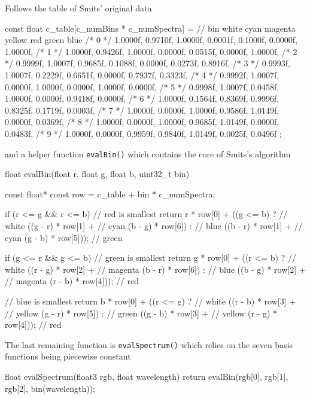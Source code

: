 Follows the table of Smits' original data

\begin{c++code}
const float c_table[c_numBins * c_numSpectra] =
{
//  bin    white    cyan     magenta  yellow   red      green    blue
/*  0  */  1.0000f, 0.9710f, 1.0000f, 0.0001f, 0.1000f, 0.0000f, 1.0000f,
/*  1  */  1.0000f, 0.9426f, 1.0000f, 0.0000f, 0.0515f, 0.0000f, 1.0000f,
/*  2  */  0.9999f, 1.0007f, 0.9685f, 0.1088f, 0.0000f, 0.0273f, 0.8916f,
/*  3  */  0.9993f, 1.0007f, 0.2229f, 0.6651f, 0.0000f, 0.7937f, 0.3323f,
/*  4  */  0.9992f, 1.0007f, 0.0000f, 1.0000f, 0.0000f, 1.0000f, 0.0000f,
/*  5  */  0.9998f, 1.0007f, 0.0458f, 1.0000f, 0.0000f, 0.9418f, 0.0000f,
/*  6  */  1.0000f, 0.1564f, 0.8369f, 0.9996f, 0.8325f, 0.1719f, 0.0003f,
/*  7  */  1.0000f, 0.0000f, 1.0000f, 0.9586f, 1.0149f, 0.0000f, 0.0369f,
/*  8  */  1.0000f, 0.0000f, 1.0000f, 0.9685f, 1.0149f, 0.0000f, 0.0483f,
/*  9  */  1.0000f, 0.0000f, 0.9959f, 0.9840f, 1.0149f, 0.0025f, 0.0496f
};
\end{c++code}

and a helper function \Verb|evalBin()| which contains the core of Smits's
algorithm


\begin{c++code}
float evalBin(float r, float g, float b, uint32_t bin)
{
    const float* const row = c_table + bin * c_numSpectra;

    if (r <= g && r <= b) // red is smallest
        return     r * row[0] + ((g <= b) ? // white
            ((g - r) * row[1] +             // cyan
             (b - g) * row[6]) :            // blue
            ((b - r) * row[1] +             // cyan
             (g - b) * row[5]));            // green

    if (g <= r && g <= b) // green is smallest
        return     g * row[0] + ((r <= b) ? // white
            ((r - g) * row[2] +             // magenta
             (b - r) * row[6]) :            // blue
            ((b - g) * row[2] +             // magenta
             (r - b) * row[4]));            // red

    // blue is smallest
    return         b * row[0] + ((r <= g) ? // white
            ((r - b) * row[3] +             // yellow
             (g - r) * row[5]) :            // green
            ((g - b) * row[3] +             // yellow
             (r - g) * row[4]));            // red
}
\end{c++code}


The last remaining function is \Verb|evalSpectrum()| which relies on the seven
basis functions being piecewise constant


\begin{c++code}
float evalSpectrum(float3 rgb, float wavelength)
{
    return evalBin(rgb[0], rgb[1], rgb[2], bin(wavelength));
}
\end{c++code}
